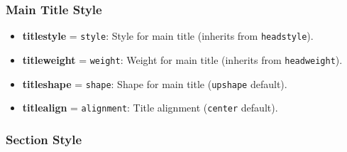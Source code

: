 \documentclass[
    margin=2cm
]{neoschool}
\begin{document}

\subsubsection{Main Title Style}

\begin{itemize}
\item
  \textbf{titlestyle} = \texttt{style}: Style for main
  title (inherits from \texttt{headstyle}).
\item
  \textbf{titleweight} = \texttt{weight}: Weight for
  main title (inherits from \texttt{headweight}).
\item
  \textbf{titleshape} = \texttt{shape}: Shape for main
  title (\texttt{upshape} default).
\item
  \textbf{titlealign} = \texttt{alignment}: Title
  alignment (\texttt{center} default).
\end{itemize}


\subsubsection{Section Style}
\end{document}
